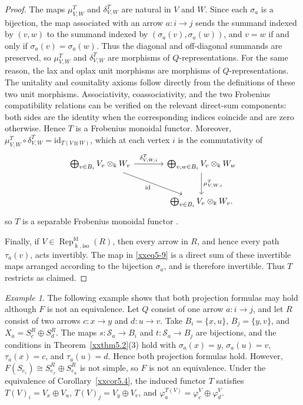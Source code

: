 \documentclass{amsart}
\newcommand{\id}{\mathrm{id}}
\theoremstyle{definition}
\theoremstyle{remark}
\newtheorem{example}[theorem]{Example}
\numberwithin{equation}{section}
\begin{document}
\begin{proof}
The maps $\mu^T_{V,W}$ and $\delta^T_{V,W}$ are natural in $V$ and
$W$.
Since each $\sigma_a$ is a bijection, the map associated with an arrow
$a\colon i\to j$ sends the summand indexed by $(v,w)$ to the summand indexed by
$(\sigma_a(v),\sigma_a(w))$, and
$v=w$ if and only if $\sigma_a(v)=\sigma_a(w)$.
Thus the diagonal and off-diagonal summands are preserved, so
$\mu^T_{V,W}$ and $\delta^T_{V,W}$ are morphisms of
$Q$-representations.
For the same reason, the lax and oplax unit morphisms
are morphisms of $Q$-representations.
The unitality and counitality axioms follow
directly from the definitions of these two unit morphisms.
Associativity, coassociativity, and the two Frobenius compatibility
relations can be verified on the relevant direct-sum components: both sides
are the identity when the corresponding indices coincide and are zero
otherwise.
Hence $T$ is a Frobenius monoidal functor.
Moreover,
$\mu^T_{V,W}\circ\delta^T_{V,W}=\id_{T(V\otimes W)}$,
which at each vertex $i$ is the commutativity of
\[
\begin{tikzcd}[column sep=large,row sep=large]
\bigoplus_{v\in B_i}V_v\otimes_{\Bbbk}W_v
  \arrow[r,"\delta^T_{V,W,i}"]
  \arrow[dr,"\id"']
&
\bigoplus_{v,w\in B_i}V_v\otimes_{\Bbbk}W_w
  \arrow[d,"\mu^T_{V,W,i}"]\\
&
\bigoplus_{v\in B_i}V_v\otimes_{\Bbbk}W_v.
\end{tikzcd}
\]
so $T$ is a separable Frobenius monoidal functor
\cite[Section~2]{MS2010}.

Finally, if $V\in\operatorname{Rep}^{\mathrm{fd}}_{\Bbbk,\mathrm{iso}}(R)$,
then every arrow in $R$, and hence every path
$\tau_a(v)$,
acts invertibly.
The map in
\eqref{xxeq5-9}
is a direct sum of these invertible maps arranged according to the bijection
$\sigma_a$,
and is therefore invertible.
Thus $T$ restricts as claimed.
\end{proof}

\begin{example}\label{xxexample5.5}
The following example shows that both projection formulas may hold although
$F$ is not an equivalence.
Let $Q$ consist of one arrow $a\colon i\to j$, and let $R$
consist of two arrows $c\colon x\to y$ and $d\colon u\to v$. Take
$B_i=\{x,u\}$, $B_j=\{y,v\}$, and $X_a=S_c^R\oplus S_d^R$.
The maps $s\colon\mathcal S_a\to B_i$ and $t\colon\mathcal S_a\to B_j$
are bijections, and the conditions in
Theorem~\ref{xxthm5.2}\textup{(3)} hold with
$\sigma_a(x)=y$, $\sigma_a(u)=v$, $\tau_a(x)=c$, and $\tau_a(u)=d$. Hence
both projection formulas hold. However,
$F(S_{e_i})\cong S_{e_x}^R\oplus S_{e_u}^R$ is not simple, so $F$ is not
an equivalence. Under the equivalence of
Corollary~\ref{xxcor5.4}, the induced functor $T$
satisfies $T(V)_i=V_x\oplus V_u$, $T(V)_j=V_y\oplus V_v$, and
$\varphi_a^{T(V)}=\varphi_c^V\oplus\varphi_d^V$.
\end{example}
\end{document}

